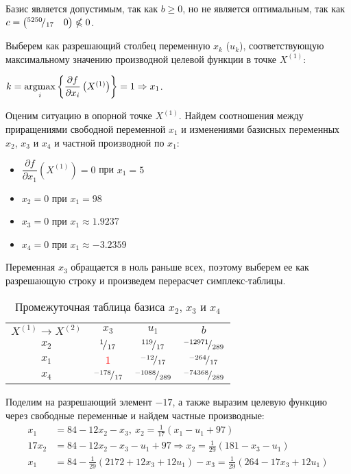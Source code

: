 Базис является допустимым, так как $b \geq 0$, но не является оптимальным, так как $c = \begin{pmatrix} {}^{5250}\!/_{17} & 0 \end{pmatrix} \nleqslant 0$.

Выберем как разрешающий столбец переменную $x_k$ ($u_k$), соответствующую максимальному значению производной целевой функции в точке $X^{(1)}$: 

$k = \operatorname*{argmax}\limits_i\left\{\dfrac{\partial f}{\partial x_i}\left(X^{(1)}\right)\right\} = 1 \Rightarrow x_1$.

Оценим ситуацию в опорной точке $X^{(1)}$. Найдем соотношения между приращениями свободной переменной $x_1$ и изменениями базисных переменных $x_2$, $x_3$ и $x_4$ и частной производной по $x_1$:
\begin{itemize}
	\item $\dfrac{\partial f}{\partial x_1}\left(X^{(1)}\right) = 0$ при $x_1 = 5$
	\item $x_2 = 0$ при $x_1 = 98$
	\item $x_3 = 0$ при $x_1 \approx 1.9237$
	\item $x_4 = 0$ при $x_1 \approx -3.2359$
\end{itemize}

Переменная $x_3$ обращается в ноль раньше всех, поэтому выберем ее как разрешающую строку и произведем перерасчет симплекс-таблицы.

\begin{table}[H]
\begin{center}
	\def\tabcolsep{25pt}
	\def\arraystretch{1.3}
	\caption{Промежуточная таблица базиса $x_2$, $x_3$ и $x_4$}
	\label{tab:simplex_1}
	\begin{tabular}{|c||c|c||c|}
		\hline
		$X^{(1)} \to X^{(2)}$ & $x_3$ & $u_1$ & $b$ \\ 
		\hhline{|=#==#=|}
		$x_2$ & ${}^{1}\!/_{17}$ & ${}^{119}\!/_{17}$ & ${}^{-12971}\!/_{289}$ \\ 
		\hline
		$x_1$ & \textcolor{red}{\boldmath$1$} & ${}^{-12}\!/_{17}$ & ${}^{-264}\!/_{17}$ \\ 
		\hline
		$x_4$ & ${}^{-178}\!/_{17}$ & ${}^{-1088}\!/_{289}$ & ${}^{-74368}\!/_{289}$ \\ 
		\hline
	\end{tabular}
\end{center}
\end{table}

Поделим на разрешающий элемент $-17$, а также выразим целевую функцию через свободные переменные и найдем частные производные:
\begin{align*}
x_1 &= 84 - 12 x_2 - x_3,\ x_2 = \frac{1}{17} (x_1 - u_1 + 97) \\
17 x_2 &= 84 - 12 x_2 - x_3 - u_1 + 97 \Rightarrow 
x_2 = \frac{1}{29} (181 - x_3 - u_1) \\
x_1 &= 84 - \frac{1}{29} (2172 + 12 x_3 + 12 u_1) - x_3 = 
\frac{1}{29} (264 - 17 x_3 + 12 u_1)
\end{align*}


